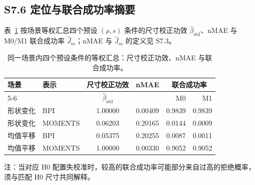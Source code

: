 \documentclass[UTF8,zihao=-4]{ctexart}
\theoremstyle{remark}
\begin{document}
\subsection*{S7.6 定位与联合成功率摘要}
表~\ref{tab:s7-loc} 按场景等权汇总四个预设 $(\rho,s)$ 条件的尺寸校正功效
$\widehat\beta_{\mathrm{std}}$、nMAE 与 M0/M1 联合成功率 $\widehat J_m$；nMAE 与
$\widehat J_m$ 的定义见 S7.3。

\begin{table}[ht]
\centering
\small
\caption{同一场景内四个预设条件的等权汇总：尺寸校正功效、nMAE 与联合成功率。}\label{tab:s7-loc}
\begin{tabular}{llccrr}
\toprule
场景 & 表示 & 尺寸校正功效 & nMAE & \multicolumn{2}{c}{联合成功率}\\
\cmidrule(lr){5-6}
 & & $\widehat\beta_{\mathrm{std}}$ & & M0 & M1\\
\midrule
形状变化 & BPI & 1.00000 & 0.00409 & 0.9839 & 0.9839\\
形状变化 & MOMENTS & 0.06203 & 0.20165 & 0.0144 & 0.0009\\
均值平移 & BPI & 0.05375 & 0.20255 & 0.0087 & 0.0011\\
均值平移 & MOMENTS & 1.00000 & 0.00330 & 0.9052 & 0.9052\\
\bottomrule
\end{tabular}
\end{table}

\noindent 注：当对应 H0 配置失校准时，较高的联合成功率可能部分来自过高的拒绝概率，须与匹配 H0 尺寸共同解释。
\end{document}
